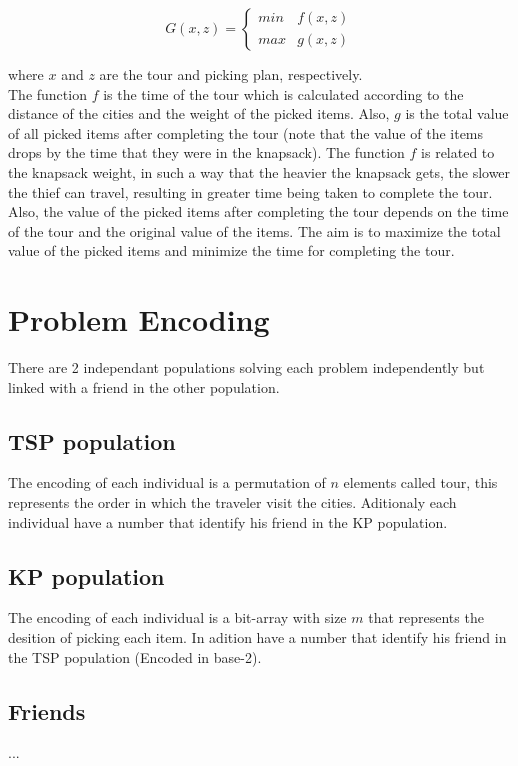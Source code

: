\documentclass[twocolumn]{IEEEtran}
\begin{document}
\begin{equation}
    G(x,z) =
\left\{
	\begin{array}{ll}
		min & f(x,z)  \\
		max & g(x,z)
	\end{array}
\right.
\end{equation}

where $x$ and $z$ are the tour and picking plan, respectively. \\

The function $f$ is the time of the tour which is calculated
according to the distance of the cities and the weight of the
picked items. Also, $g$ is the total value of all picked items after
completing the tour (note that the value of the items drops by
the time that they were in the knapsack). The function $f$ is
related to the knapsack weight, in such a way that the heavier
the knapsack gets, the slower the thief can travel, resulting in
greater time being taken to complete the tour. Also, the value
of the picked items after completing the tour depends on the
time of the tour and the original value of the items. The aim is
to maximize the total value of the picked items and minimize
the time for completing the tour. 

\section{Problem Encoding}

There are 2 independant populations solving each problem independently but linked with a friend in the other population. %

\subsection{TSP population}
The encoding of each individual is a permutation of $n$ elements called tour,
this represents the order in which the traveler visit the cities. 
Aditionaly each individual have a number that identify his friend in the KP population.

\subsection{KP population}
The encoding of each individual is a bit-array with size $m$ that represents the desition of picking each item.
In adition have a number that identify his friend in the TSP population (Encoded in base-2).

\subsection{Friends}
...
\end{document}
